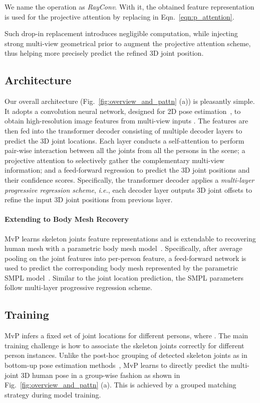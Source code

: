 \documentclass{article}
\newcommand{\ie}{\emph{i.e.}}
\begin{document}
{We name the operation as \emph{RayConv}. With it, the obtained feature representation  is used for the projective attention by replacing  in Eqn.~\eqref{eqn:p_attention}.
 
Such drop-in replacement  
introduces negligible computation, while injecting strong multi-view geometrical prior to augment the projective attention scheme,  
thus helping more precisely predict the refined 3D joint position.
}

\subsection{Architecture}
\label{sec:arch}
Our overall architecture (Fig.~\ref{fig:overview_and_pattn} (a)) is pleasantly simple.
It adopts a convolution neural network, designed for 2D pose estimation~\cite{xiao2018simple}, to obtain high-resolution image features  from multi-view inputs .
The features are then fed into the transformer decoder  consisting of   multiple decoder layers to predict the 3D joint locations.
Each layer conducts a self-attention  to perform  pair-wise   interaction between  all the joints from all the persons in the scene; a projective attention   to selectively gather the complementary multi-view information; {and a feed-forward   regression to predict the  3D joint positions and      their   confidence scores.
Specifically, the transformer decoder   applies  a \textit{multi-layer progressive regression scheme},  \ie, each decoder layer outputs 3D joint offsets to refine the input 3D joint positions from previous layer.}


\paragraph{Extending to Body Mesh Recovery}
MvP learns skeleton joints feature representations and is extendable to recovering human mesh with a parametric body mesh model~\cite{loper2015smpl}. Specifically, after average pooling on the joint features into per-person feature, a feed-forward network is used to predict the corresponding body mesh represented by the parametric SMPL model~\cite{loper2015smpl}.
Similar to the joint location prediction, the SMPL parameters follow multi-layer progressive regression scheme.

\subsection{Training}
\label{sec:training}
MvP infers a fixed set of  joint locations for  different persons, {where }. 
The main training challenge   is how to associate the skeleton joints correctly for different person instances. Unlike the post-hoc grouping of detected skeleton joints as in bottom-up pose estimation methods~\cite{papandreou2018personlab,kreiss2019pifpaf}, MvP learns to directly predict the multi-joint 3D human pose in a group-wise fashion as shown in Fig.~\ref{fig:overview_and_pattn} (a). This is achieved by a grouped matching strategy during model training.
\end{document}
